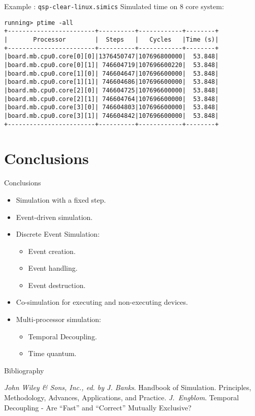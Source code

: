 \begin{frame}[fragile]{Example : \texttt{qsp-clear-linux.simics}}
Simulated time on 8 core system:
\begin{verbatim}
running> ptime -all
+------------------------+----------+------------+--------+
|       Processor        |  Steps   |   Cycles   |Time (s)|
+------------------------+----------+------------+--------+
|board.mb.cpu0.core[0][0]|1376450747|107696800000|  53.848|
|board.mb.cpu0.core[0][1]| 746604719|107696600220|  53.848|
|board.mb.cpu0.core[1][0]| 746604647|107696600000|  53.848|
|board.mb.cpu0.core[1][1]| 746604686|107696600000|  53.848|
|board.mb.cpu0.core[2][0]| 746604725|107696600000|  53.848|
|board.mb.cpu0.core[2][1]| 746604764|107696600000|  53.848|
|board.mb.cpu0.core[3][0]| 746604803|107696600000|  53.848|
|board.mb.cpu0.core[3][1]| 746604842|107696600000|  53.848|
+------------------------+----------+------------+--------+
\end{verbatim}
\end{frame}

\section*{Conclusions}

\begin{frame}{Conclusions}
\begin{itemize}
\item Simulation with a fixed step.
\item Event-driven simulation.
\item Discrete Event Simulation:
  \begin{itemize}
  \item Event creation.
  \item Event handling.
  \item Event destruction.
  \end{itemize}
\item Co-simulation for executing and non-executing devices.
\item Multi-processor simulation:
  \begin{itemize}
    \item Temporal Decoupling.
    \item Time quantum.
  \end{itemize}
\end{itemize}
\end{frame}

\begin{frame}[allowframebreaks]{Bibliography}
\begin{thebibliography}{99}
  \bibitem{} \textit{John Wiley \& Sons, Inc., ed. by J. Banks}. Handbook of
    Simulation. Principles, Methodology, Advances, Applications, and Practice.
  \bibitem{} \textit{J.~Engblom}. Temporal Decoupling - Are “Fast” and
    “Correct” Mutually Exclusive?
\end{thebibliography}
\end{frame}


